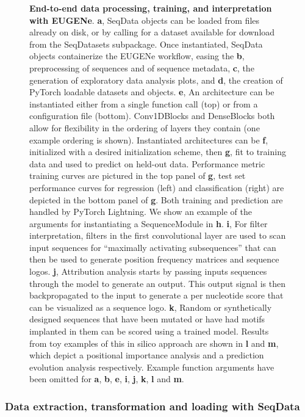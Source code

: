 \begin{figure}[p]
    \caption[End-to-end data processing with EUGENe]{\textbf{End-to-end data processing, training, and interpretation with EUGENe}. \textbf{a}, SeqData objects can be loaded from files already on disk, or by calling for a dataset available for download from the SeqDatasets subpackage. Once instantiated, SeqData objects containerize the EUGENe workflow, easing the \textbf{b}, preprocessing of sequences and of sequence metadata, \textbf{c}, the generation of exploratory data analysis plots, and \textbf{d}, the creation of PyTorch loadable datasets and objects. \textbf{e}, An architecture can be instantiated either from a single function call (top) or from a configuration file (bottom). Conv1DBlocks and DenseBlocks both allow for flexibility in the ordering of layers they contain (one example ordering is shown). Instantiated architectures can be \textbf{f}, initialized with a desired initialization scheme, then \textbf{g}, fit to training data and used to predict on held-out data. Performance metric training curves are pictured in the top panel of \textbf{g}, test set performance curves for regression (left) and classification (right) are depicted in the bottom panel of \textbf{g}. Both training and prediction are handled by PyTorch Lightning. We show an example of the arguments for instantiating a SequenceModule in \textbf{h}. \textbf{i}, For filter interpretation, filters in the first convolutional layer are used to scan input sequences for “maximally activating subsequences” that can then be used to generate position frequency matrices and sequence logos. \textbf{j}, Attribution analysis starts by passing inputs sequences through the model to generate an output. This output signal is then backpropagated to the input to generate a per nucleotide score that can be visualized as a sequence logo. \textbf{k}, Random or synthetically designed sequences that have been mutated or have had motifs implanted in them can be scored using a trained model. Results from toy examples of this in silico approach are shown in \textbf{l} and \textbf{m}, which depict a positional importance analysis and a prediction evolution analysis respectively. Example function arguments have been omitted for \textbf{a}, \textbf{b}, \textbf{e}, \textbf{i}, \textbf{j}, \textbf{k}, \textbf{l} and \textbf{m}.}
    \label{fig:1 Figure 5}
\end{figure}

\subsubsection{Data extraction, transformation and loading with SeqData}

